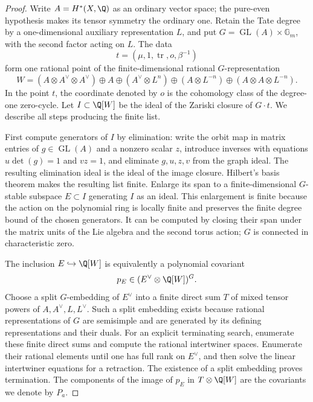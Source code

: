 \begin{proof}
Write $A=H^*(X,\Q)$ as an ordinary vector space; the pure-even
hypothesis makes its tensor symmetry the ordinary one.  Retain the
Tate degree by a one-dimensional auxiliary representation $L$, and
put $G=\operatorname{GL}(A)\times\mathbb G_m$, with the second factor
acting on $L$.  The data
\[
 t=(\mu,1,\operatorname{tr},o,\beta^{-1})
\]
form one rational point of the finite-dimensional rational
$G$-representation
\[
 W=(A\otimes A^\vee\otimes A^\vee)\oplus A
   \oplus(A^\vee\otimes L^n)
   \oplus(A\otimes L^{-n})
   \oplus(A\otimes A\otimes L^{-n}).
\]
In the point $t$, the coordinate denoted by $o$ is the cohomology class
of the degree-one zero-cycle.  Let $I\subset\Q[W]$ be the ideal of
the Zariski closure of $G\cdot t$.  We describe all steps producing
the finite list.

First compute generators of $I$ by elimination: write the orbit map
in matrix entries of $g\in\operatorname{GL}(A)$ and a nonzero scalar
$z$, introduce inverses with equations $u\det(g)=1$ and $vz=1$, and
eliminate $g,u,z,v$ from the graph ideal.  The resulting elimination
ideal is the ideal of the image closure.  Hilbert's basis theorem
makes the resulting list finite.  Enlarge its span to a finite-dimensional
$G$-stable subspace $E\subset I$ generating $I$ as an ideal.
This enlargement is finite because the action on the polynomial ring
is locally finite and preserves the finite degree bound of the chosen
generators.  It can be computed by closing their span under the matrix
units of the Lie algebra and the second torus action; $G$ is connected
in characteristic zero.

The inclusion $E\hookrightarrow\Q[W]$ is equivalently a polynomial
covariant
\[
 p_E\in(E^\vee\otimes\Q[W])^G.
\]
Choose a split $G$-embedding of $E^\vee$ into a finite direct sum $T$
of mixed tensor powers of $A,A^\vee,L,L^\vee$.  Such a split embedding
exists because rational representations of $G$ are semisimple and
are generated by its defining representations and their duals.
For an explicit terminating search, enumerate these finite direct
sums and compute the rational intertwiner spaces.  Enumerate their
rational elements until one has full rank on $E^\vee$, and then
solve the linear intertwiner equations for a retraction.  The
existence of a split embedding proves termination.  The components of the image of
$p_E$ in $T\otimes\Q[W]$ are the covariants we denote by $P_a$.


\end{proof}
